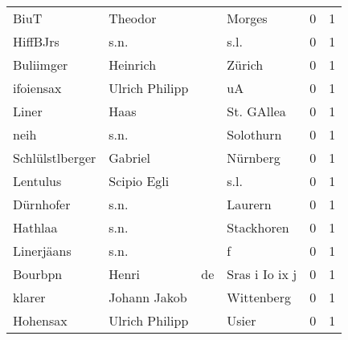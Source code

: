 \begin{tabular}{llllrr}
                     BiuT &                            Theodor &             &                                      Morges &          0 &         1 \\
                 HiffBJrs &                               s.n. &             &                                        s.l. &          0 &         1 \\
                Buliimger &                           Heinrich &             &                                      Zürich &          0 &         1 \\
                ifoiensax &                     Ulrich Philipp &             &                                          uA &          0 &         1 \\
                    Liner &                               Haas &             &                                  St. GAllea &          0 &         1 \\
                     neih &                               s.n. &             &                                   Solothurn &          0 &         1 \\
          Schlülstlberger &                            Gabriel &             &                                    Nürnberg &          0 &         1 \\
                 Lentulus &                        Scipio Egli &             &                                        s.l. &          0 &         1 \\
                Dürnhofer &                               s.n. &             &                                     Laurern &          0 &         1 \\
                  Hathlaa &                               s.n. &             &                                  Stackhoren &          0 &         1 \\
               Linerjäans &                               s.n. &             &                                           f &          0 &         1 \\
                  Bourbpn &                              Henri &          de &                              Sras i Io ix j &          0 &         1 \\
                   klarer &                       Johann Jakob &             &                                  Wittenberg &          0 &         1 \\
                 Hohensax &                     Ulrich Philipp &             &                                       Usier &          0 &         1 \\

\end{tabular}
